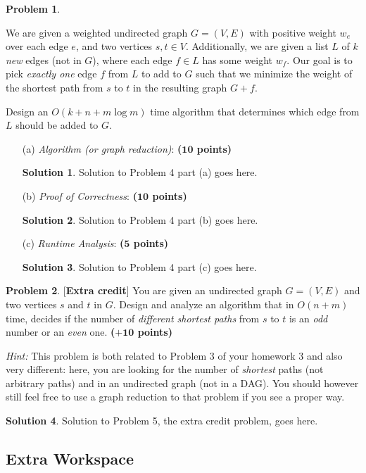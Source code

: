 \documentclass{article}
\theoremstyle{definition}
\newtheorem{problem}{Problem}
\newtheorem*{solution*}{Solution}
\newenvironment{solution}{\begin{solution*}}{{} \end{solution*}}
\newcommand{\grade}[1]{\hfill{\textbf{($\mathbf{#1}$ points)}}}
\begin{document}
\begin{problem}\label{sp}

We are given a weighted undirected graph $G=(V,E)$ with positive weight $w_e$ over each edge $e$, and two vertices $s,t \in V$. Additionally, we are given a list $L$ of $k$ \emph{new} edges (not in $G$), where each edge $f \in L$ has some weight $w_f$. 
Our goal is to pick \emph{exactly one} edge $f$ from $L$ to add to $G$ such that we minimize the weight of the shortest path from $s$ to $t$ in the resulting graph $G+f$. 

Design an $O(k+n+m\log{m})$ time algorithm that determines which edge from $L$ should be added to $G$. 

\begin{enumerate}
	\item[(a)] \emph{Algorithm (or graph reduction)}: \grade{10} 
	
	
\begin{solution}
	Solution to Problem 4 part (a) goes here. 
\end{solution}

	\newpage
	\item[(b)] \emph{Proof of Correctness}: \grade{10} 


\begin{solution}
	Solution to Problem 4 part (b) goes here. 
\end{solution}


\bigskip


	\item[(c)] \emph{Runtime Analysis}: \grade{5} 
	
	
\begin{solution}
	Solution to Problem 4 part (c) goes here. 
\end{solution}

\end{enumerate}

\end{problem}

\newpage

\newpage

\begin{problem}\label{extra}[\textbf{Extra credit}]
	You are given an undirected graph $G=(V,E)$ and two vertices $s$ and $t$ in $G$. Design and analyze an algorithm that in $O(n+m)$ time, decides if the number of \emph{different shortest paths} from $s$ to $t$ is an \emph{odd} number or an \emph{even} one. 
	\grade{+10}
	
	\emph{Hint:} This problem is both related to Problem 3 of your homework 3 and also very different: here, you are looking for the number of \emph{shortest} paths (not arbitrary paths) and in an undirected graph (not in a DAG). You should however still feel free to use a graph reduction to that problem 
	if you see a proper way. 
	
\end{problem}


\begin{solution}
	Solution to Problem 5, the extra credit problem, goes here. 
\end{solution}

\newpage
\subsection*{Extra Workspace}
\end{document}
